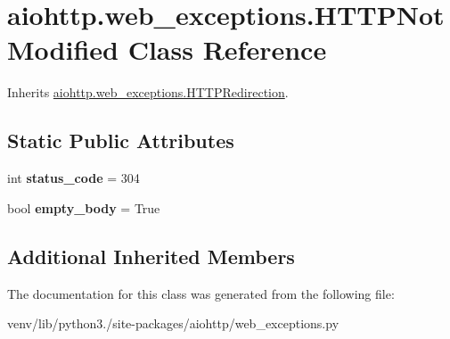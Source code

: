 \hypertarget{classaiohttp_1_1web__exceptions_1_1_h_t_t_p_not_modified}{}\section{aiohttp.\+web\+\_\+exceptions.\+H\+T\+T\+P\+Not\+Modified Class Reference}
\label{classaiohttp_1_1web__exceptions_1_1_h_t_t_p_not_modified}


Inherits \hyperlink{classaiohttp_1_1web__exceptions_1_1_h_t_t_p_redirection}{aiohttp.\+web\+\_\+exceptions.\+H\+T\+T\+P\+Redirection}.

\subsection*{Static Public Attributes}
\begin{DoxyCompactItemize}
\item 
\mbox{\label{classaiohttp_1_1web__exceptions_1_1_h_t_t_p_not_modified_a14e756aa908e8655da36ceca43dfce15}} 
int {\bfseries status\+\_\+code} = 304
\item 
\mbox{\label{classaiohttp_1_1web__exceptions_1_1_h_t_t_p_not_modified_aeefa92fde200fefe286d30ddf936044f}} 
bool {\bfseries empty\+\_\+body} = True
\end{DoxyCompactItemize}
\subsection*{Additional Inherited Members}


The documentation for this class was generated from the following file\+:\begin{DoxyCompactItemize}
\item 
venv/lib/python3./site-\/packages/aiohttp/web\+\_\+exceptions.\+py\end{DoxyCompactItemize}
